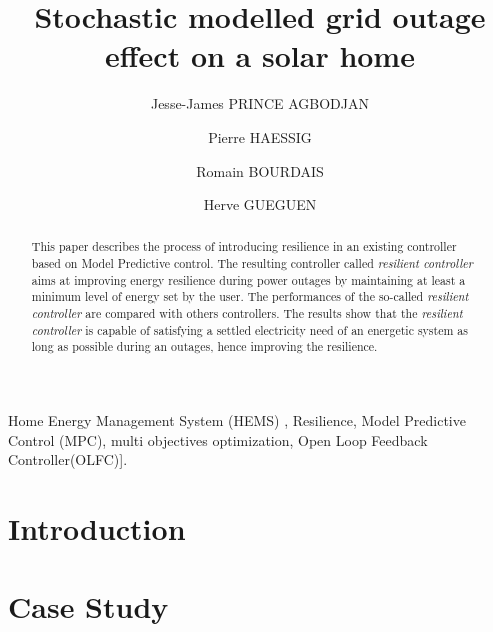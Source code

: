 \documentclass{ifacconf}
\begin{document}
\begin{frontmatter}

\title{Stochastic modelled grid outage effect on a solar home} 

\author[First]{Jesse-James PRINCE AGBODJAN}
\author[First]{Pierre HAESSIG} 
\author[First]{Romain BOURDAIS}
\author[First]{Herve GUEGUEN}

\address[First]{CentraleSupelec CNRS IETR (Institut d'Electronique et de Telecommunications de Rennes), UMR 6164, F-35000 Rennes, France (e-mails : \{jesse-james.prince-agbodjan, pierre.haessig, romain.bourdais, herve.gueguen\}@centralesupelec.fr)}

\begin{abstract}                %
This paper describes the process of introducing resilience in an existing controller based on Model Predictive control. The resulting controller called \textit{resilient controller} aims at improving energy resilience during power outages by maintaining at least a minimum level of energy set by the user. The performances of the so-called \textit{resilient controller} are compared with others controllers. The results show that the \textit {resilient controller} is capable of satisfying a settled electricity need of an energetic system as long as possible during an outages, hence improving the resilience.
\end{abstract}

\begin{keyword}
Home Energy Management System (HEMS) , Resilience, Model Predictive Control (MPC), multi objectives optimization, Open Loop Feedback Controller(OLFC)].
\end{keyword}

\end{frontmatter}

\section{Introduction}


\section{Case Study}\label{Section2}
\end{document}
